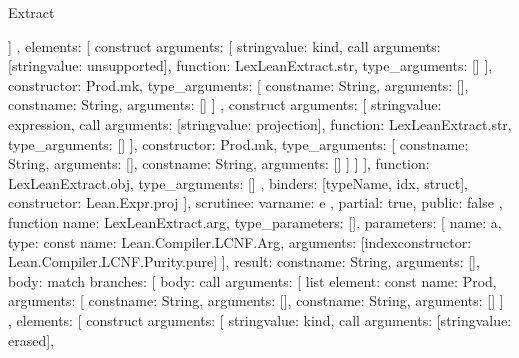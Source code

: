 \begin{lexlean}{Extract}
\begin{toolingmodule}
{{{{{{{                    ]
                  },
                  elements: [
                    construct{
                      arguments: [
                        string{value: kind},
                        call{
                          arguments: [string{value: unsupported}],
                          function: LexLeanExtract.str,
                          type_arguments: []
                        }
                      ],
                      constructor: Prod.mk,
                      type_arguments: [
                        const{name: String, arguments: []},
                        const{name: String, arguments: []}
                      ]
                    },
                    construct{
                      arguments: [
                        string{value: expression},
                        call{
                          arguments: [string{value: projection}],
                          function: LexLeanExtract.str,
                          type_arguments: []
                        }
                      ],
                      constructor: Prod.mk,
                      type_arguments: [
                        const{name: String, arguments: []},
                        const{name: String, arguments: []}
                      ]
                    }
                  ]
                }
              ],
              function: LexLeanExtract.obj,
              type_arguments: []
            },
            binders: [typeName, idx, struct],
            constructor: Lean.Expr.proj
          }
        ],
        scrutinee: var{name: e}
      },
      partial: true,
      public: false
    },
    function{
      name: LexLeanExtract.arg,
      type_parameters: [],
      parameters: [
        {
          name: a,
          type: const{
            name: Lean.Compiler.LCNF.Arg,
            arguments: [index{constructor: Lean.Compiler.LCNF.Purity.pure}]
          }
        }
      ],
      result: const{name: String, arguments: []},
      body: match{
        branches: [
          {
            body: call{
              arguments: [
                list{
                  element: const{
                    name: Prod,
                    arguments: [
                      const{name: String, arguments: []},
                      const{name: String, arguments: []}
                    ]
                  },
                  elements: [
                    construct{
                      arguments: [
                        string{value: kind},
                        call{
                          arguments: [string{value: erased}],
}}}}}}}}
\end{toolingmodule}
\end{lexlean}
